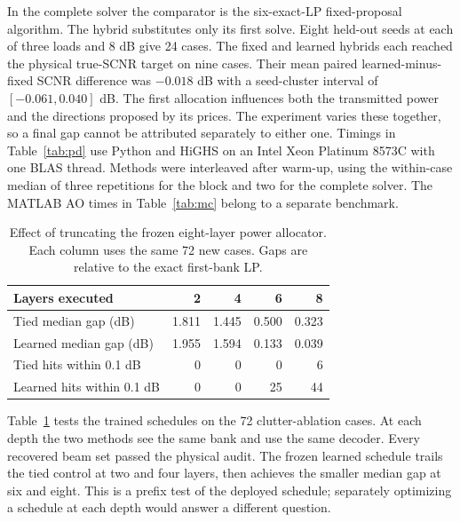 In the complete solver the comparator is the six-exact-LP fixed-proposal algorithm. The hybrid substitutes only its first solve. Eight held-out seeds at each of three loads and 8 dB give 24 cases. The fixed and learned hybrids each reached the physical true-SCNR target on nine cases. Their mean paired learned-minus-fixed SCNR difference was $-0.018$ dB with a seed-cluster interval of $[-0.061,0.040]$ dB. The first allocation influences both the transmitted power and the directions proposed by its prices. The experiment varies these together, so a final gap cannot be attributed separately to either one. Timings in Table~\ref{tab:pd} use Python and HiGHS on an Intel Xeon Platinum 8573C with one BLAS thread. Methods were interleaved after warm-up, using the within-case median of three repetitions for the block and two for the complete solver. The MATLAB AO times in Table~\ref{tab:mc} belong to a separate benchmark.

\begin{table}[t]\centering\footnotesize
\caption{Effect of truncating the frozen eight-layer power allocator. Each column uses the same 72 new cases. Gaps are relative to the exact first-bank LP.}
\begin{tabular}{lrrrr}\toprule
Layers executed & 2 & 4 & 6 & 8\\\midrule
Tied median gap (dB)&1.811&1.445&0.500&0.323\\
Learned median gap (dB)&1.955&1.594&0.133&0.039\\
Tied hits within 0.1 dB&0&0&0&6\\
Learned hits within 0.1 dB&0&0&25&44\\\bottomrule
\end{tabular}\label{tab:prefix}\end{table}
Table~\ref{tab:prefix} tests the trained schedules on the 72 clutter-ablation cases. At each depth the two methods see the same bank and use the same decoder. Every recovered beam set passed the physical audit. The frozen learned schedule trails the tied control at two and four layers, then achieves the smaller median gap at six and eight. This is a prefix test of the deployed schedule; separately optimizing a schedule at each depth would answer a different question.
